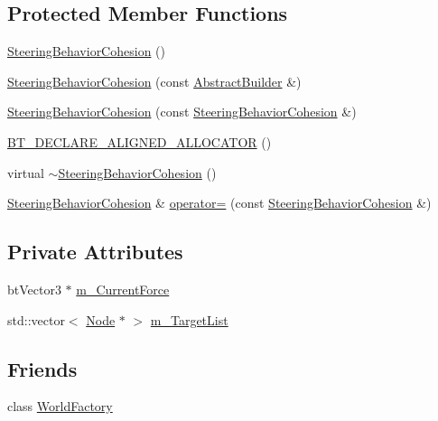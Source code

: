 \subsection*{Protected Member Functions}
\begin{DoxyCompactItemize}
\item 
\mbox{\hyperlink{classnjli_1_1_steering_behavior_cohesion_a13d763269bd16faa286f62929b6ed76b}{Steering\+Behavior\+Cohesion}} ()
\item 
\mbox{\hyperlink{classnjli_1_1_steering_behavior_cohesion_a83a322d01518b3433f2758448dbf0bba}{Steering\+Behavior\+Cohesion}} (const \mbox{\hyperlink{classnjli_1_1_abstract_builder}{Abstract\+Builder}} \&)
\item 
\mbox{\hyperlink{classnjli_1_1_steering_behavior_cohesion_a33cee2f374ef4ae1bd6032325d88c7a1}{Steering\+Behavior\+Cohesion}} (const \mbox{\hyperlink{classnjli_1_1_steering_behavior_cohesion}{Steering\+Behavior\+Cohesion}} \&)
\item 
\mbox{\hyperlink{classnjli_1_1_steering_behavior_cohesion_af50b98139986c71ab0ba5cc3703e07e2}{B\+T\+\_\+\+D\+E\+C\+L\+A\+R\+E\+\_\+\+A\+L\+I\+G\+N\+E\+D\+\_\+\+A\+L\+L\+O\+C\+A\+T\+OR}} ()
\item 
virtual \mbox{\hyperlink{classnjli_1_1_steering_behavior_cohesion_a01d7595251a0b50be826377284e0e206}{$\sim$\+Steering\+Behavior\+Cohesion}} ()
\item 
\mbox{\hyperlink{classnjli_1_1_steering_behavior_cohesion}{Steering\+Behavior\+Cohesion}} \& \mbox{\hyperlink{classnjli_1_1_steering_behavior_cohesion_a9c73dffbdbdbb311e25197caedfe2ba3}{operator=}} (const \mbox{\hyperlink{classnjli_1_1_steering_behavior_cohesion}{Steering\+Behavior\+Cohesion}} \&)
\end{DoxyCompactItemize}
\subsection*{Private Attributes}
\begin{DoxyCompactItemize}
\item 
bt\+Vector3 $\ast$ \mbox{\hyperlink{classnjli_1_1_steering_behavior_cohesion_a8212107f6ae961d1466c40a031ee044e}{m\+\_\+\+Current\+Force}}
\item 
std\+::vector$<$ \mbox{\hyperlink{classnjli_1_1_node}{Node}} $\ast$ $>$ \mbox{\hyperlink{classnjli_1_1_steering_behavior_cohesion_a1e7a72418342e530082f3477ad4f52c6}{m\+\_\+\+Target\+List}}
\end{DoxyCompactItemize}
\subsection*{Friends}
\begin{DoxyCompactItemize}
\item 
class \mbox{\hyperlink{classnjli_1_1_steering_behavior_cohesion_acb96ebb09abe8f2a37a915a842babfac}{World\+Factory}}
\end{DoxyCompactItemize}
